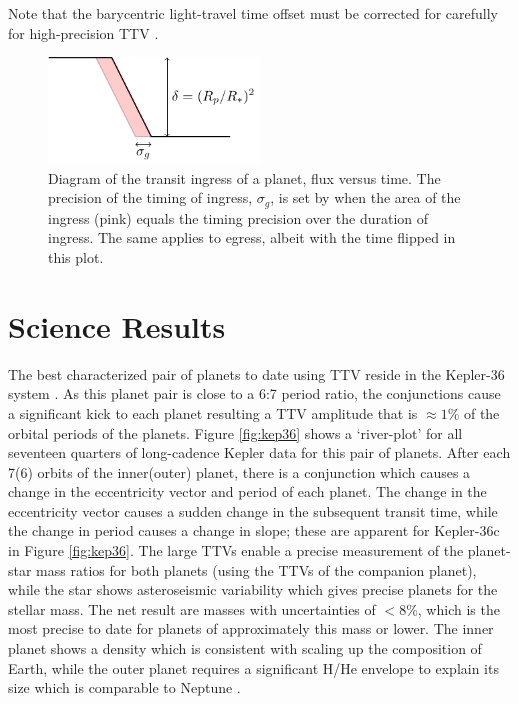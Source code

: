 \documentclass[graybox,natbib,nosecnum]{svmult}
\begin{document}
Note that the barycentric light-travel time offset must be corrected for carefully for high-precision
TTV \citep{2010PASP..122..935E}.

\begin{figure}
\centerline{
\includegraphics[width=0.5\textwidth]{ingress.pdf}}
%
\caption{Diagram of the transit ingress of a planet, flux versus time.  The precision of the timing of ingress, $\sigma_g$, is set by
when the area of the ingress (pink) equals the timing precision over the duration of ingress. The same applies to egress, albeit
with the time flipped in this plot.}
\label{fig:ingress}       %
\end{figure}


\section{Science Results}

The best characterized pair of planets to date using TTV reside in the Kepler-36 system \citep{2012Sci...337..556C}.  As this planet pair is close to a 6:7 period ratio, the conjunctions cause a significant kick to each planet resulting a TTV amplitude that is $\approx 1$\% of the orbital periods of the planets.  Figure \ref{fig:kep36} shows a `river-plot' for all seventeen quarters of long-cadence Kepler data for this pair of planets.  After each 7(6) orbits of the inner(outer) planet, there is a conjunction which causes a change in the eccentricity vector and period of each planet.  The change in the eccentricity vector causes a sudden change in the subsequent transit time, while the change in period causes a change in slope;  these are apparent for Kepler-36c in Figure \ref{fig:kep36}.  The large TTVs enable a precise measurement of the planet-star mass ratios for both planets (using the TTVs of the companion planet), while the star shows asteroseismic variability which gives precise planets for the stellar mass.   The net result are masses with uncertainties of $<8$\%, which is the most precise to date for planets of approximately this mass or lower.  The inner planet shows a density which is consistent with scaling up the composition of Earth, while the outer planet requires a significant H/He envelope to explain its size which is comparable to Neptune \citep{2012Sci...337..556C}.
\end{document}

